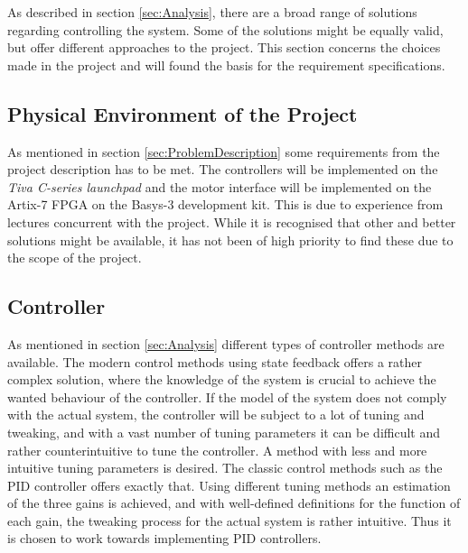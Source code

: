 \documentclass[../../main.tex]{subfiles}
\begin{document}
As described in section \ref{sec:Analysis}, there are a broad range of solutions regarding controlling the system. Some of the solutions might be equally valid, but offer different approaches to the project. This section concerns the choices made in the project and will found the basis for the requirement specifications.

\subsection*{Physical Environment of the Project}
As mentioned in section \ref{sec:ProblemDescription} some requirements from the project description has to be met. The controllers will be implemented on the \textit{Tiva C-series launchpad} and the motor interface will be implemented on the Artix-7 FPGA on the Basys-3 development kit. This is due to experience from lectures concurrent with the project. While it is recognised that other and better solutions might be available, it has not been of high priority to find these due to the scope of the project. 



\subsection*{Controller}
As mentioned in section \ref{sec:Analysis} different types of controller methods are available. The modern control methods using state feedback offers a rather complex solution, where the knowledge of the system is crucial to achieve the wanted behaviour of the controller. If the model of the system does not comply with the actual system, the controller will be subject to a lot of tuning and tweaking, and with a vast number of tuning parameters it can be difficult and rather counterintuitive to tune the controller. A method with less and more intuitive tuning parameters is desired. The classic control methods such as the PID controller offers exactly that. Using different tuning methods an estimation of the three gains is achieved, and with well-defined definitions for the function of each gain, the tweaking process for the actual system is rather intuitive. Thus it is chosen to work towards implementing PID controllers.
\end{document}
